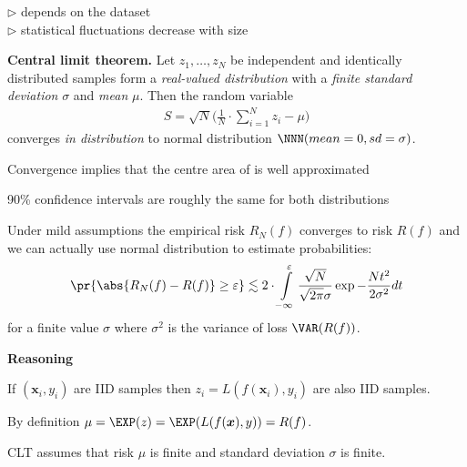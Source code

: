 \documentclass[landscape,footrule]{foils}
\renewcommand{\vec}[1]{\boldsymbol{#1}}
\begin{document}
\vspace*{-0.0cm}
$\triangleright$  depends on the dataset\\
$\triangleright$  statistical fluctuations decrease with size




\textbf{Central limit theorem.}
Let $z_1, \ldots, z_N$ be independent and identically distributed samples form a \emph{real-valued distribution} with a \emph{finite standard deviation} $\sigma$ and \emph{mean} $\mu$. Then the random variable 
\begin{align*}
S=\sqrt{N}\Biggl(\frac{1}{N}\cdot \sum_{i=1}^N z_i -\mu\Biggr)
\end{align*}
converges \emph{in distribution} to normal distribution $\NNN(mean=0, sd=\sigma)$.  




\vspace*{-0.5cm}

Convergence implies that the centre area of is well approximated 
\begin{triangles}
\item 90\% confidence intervals are roughly the same for both distributions
\end{triangles}




Under mild assumptions the empirical risk $R_N(f)$ converges to risk $R(f)$ and we can actually use normal distribution to estimate probabilities:
\begin{align*}
\pr{\abs{R_N(f)-R(f)}\geq \varepsilon} \lesssim 2\cdot \int\limits_{-\infty}^\varepsilon\frac{\sqrt{N}}{\sqrt{2\pi}\sigma}\exp{-\frac{N t^2}{2 \sigma^2}}dt
\end{align*}
for a finite value $\sigma$ where $\sigma^2$ is the variance of loss $\VAR(R(f))$.
\vspace*{1cm}

\textbf{Reasoning}
\begin{triangles}
\item If $(\vec{x}_i, y_i)$ are IID samples then $z_i=L(f(\vec{x}_i), y_i)$ are also IID samples.
\item By definition $\mu=\EXP(z)=\EXP(L(f(\vec{x}),y))=R(f)$.
\item CLT assumes that risk $\mu$ is finite and standard deviation $\sigma$ is finite.
\end{triangles}
\bigskip
\end{document}

